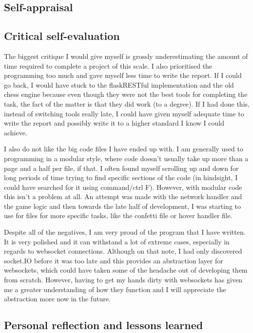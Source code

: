 \begin{appendices}

\chapter{Self-appraisal}

\section{Critical self-evaluation}

The biggest critique I would give myself is grossly underestimating the amount of time required to complete a project of this scale. I also prioritised the programming too much and gave myself less time to write the report. If I could go back, I would have stuck to the flaskRESTful implementation and the old chess engine because even though they were not the best tools for completing the task, the fact of the matter is that they did work (to a degree). If I had done this, instead of switching tools really late, I could have given myself adequate time to write the report and possibly write it to a higher standard I know I could achieve.

I also do not like the big code files I have ended up with. I am generally used to programming in a modular style, where code doesn't usually take up more than a page and a half per file, if that. I often found myself scrolling up and down for long periods of time trying to find specific sections of the code (in hindsight, I could have searched for it using command/ctrl F). However, with modular code this isn't a problem at all. An attempt was made with the network handler and the game logic and then towards the late half of development, I was starting to use for files for more specific tasks, like the confetti file or hover handler file.

Despite all of the negatives, I am very proud of the program that I have written. It is very polished and it can withstand a lot of extreme cases, especially in regards to websocket connections. Although on that note, I had only discovered socket.IO before it was too late and this provides an abstraction layer for websockets, which could have taken some of the headache out of developing them from scratch. However, having to get my hands dirty with websockets has given me a greater understanding of how they function and I will appreciate the abstraction more now in the future.

\section{Personal reflection and lessons learned}


\end{appendices}
